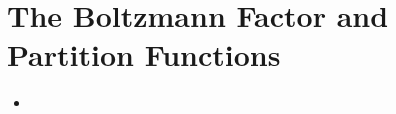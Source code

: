 \documentclass[../notes.tex]{subfiles}
\begin{document}
\chapter{The Boltzmann Factor and Partition Functions}
\begin{itemize}
    \item {}
\end{itemize}
\end{document}
